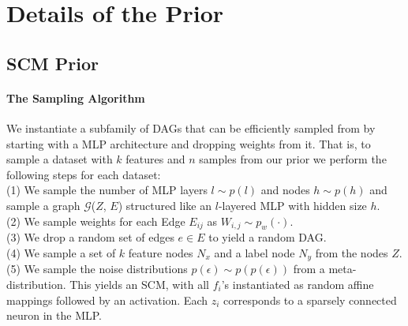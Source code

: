 \documentclass{article}
\begin{document}

\section{Details of the \methodname{} Prior}
\label{app:a prior for tabular data}
\subsection{SCM Prior}
\label{sec:details_scm_prior}
\paragraph{The Sampling Algorithm}
We instantiate a subfamily of DAGs that can be efficiently sampled from by starting with a MLP architecture and dropping weights from it.
That is, to sample a dataset with $k$ features and $n$ samples from our prior we perform the following steps for each dataset: \\
\hphantom{~~~~}(1) We sample the number of MLP layers $l \sim p(l)$ and nodes $h \sim p(h)$ and sample a graph $\mathcal{G}$($Z$, $E$) structured like an $l$-layered MLP with hidden size $h$.\\%
\hphantom{~~~~}(2) We sample weights for each Edge $E_{ij}$ %
as $W_{i,j} \sim p_w(\cdot)$.\\
\hphantom{~~~~}(3) We drop a random set of edges $e \in E$ to yield a random DAG.\\
\hphantom{~~~~}(4) We sample a set of $k$ feature nodes $N_x$  and a label node $N_y$ from the nodes $Z$.\\
\hphantom{~~~~}(5) We sample the noise distributions $p(\epsilon) \sim p(p(\epsilon))$ from a meta-distribution. %
This yields an SCM, with all $f_i$'s instantiated as random affine mappings followed by an activation. Each $z_i$ corresponds to a sparsely connected neuron in the MLP.
\end{document}
